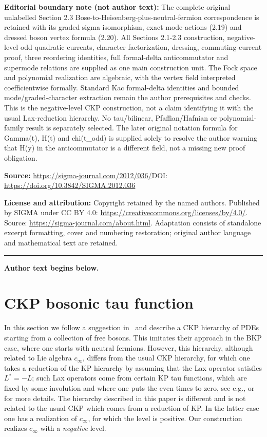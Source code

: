 \documentclass[11pt]{article}
\numberwithin{equation}{section}
\begin{document}
\noindent\textbf{Editorial boundary note (not author text):} The complete original unlabelled Section 2.3 Bose-to-Heisenberg-plus-neutral-fermion correspondence is retained with its graded sigma isomorphism, exact mode actions (2.19) and dressed boson vertex formula (2.20). All Sections 2.1-2.3 construction, negative-level odd quadratic currents, character factorization, dressing, commuting-current proof, three reordering identities, full formal-delta anticommutator and supermode relations are supplied as one main construction unit. The Fock space and polynomial realization are algebraic, with the vertex field interpreted coefficientwise formally. Standard Kac formal-delta identities and bounded mode/graded-character extraction remain the author prerequisites and checks. This is the negative-level CKP construction, not a claim identifying it with the usual Lax-reduction hierarchy. No tau/bilinear, Pfaffian/Hafnian or polynomial-family result is separately selected. The later original notation formula for Gamma(t), H(t) and chi(t\_odd) is supplied solely to resolve the author warning that H(y) in the anticommutator is a different field, not a missing new proof obligation.\par
\noindent\textbf{Source:} \url{https://sigma-journal.com/2012/036/}\quad DOI: \url{https://doi.org/10.3842/SIGMA.2012.036}\par
\noindent\textbf{License and attribution:} Copyright retained by the named authors. Published by SIGMA under CC BY 4.0: \url{https://creativecommons.org/licenses/by/4.0/}. Source: \url{https://sigma-journal.com/about.html}. Adaptation consists of standalone excerpt formatting, cover and numbering restoration; original author language and mathematical text are retained.\par
\medskip\hrule\medskip\noindent\textbf{Author text begins below.}\par
\setcounter{section}{1}
\setcounter{subsection}{0}
\setcounter{subsubsection}{0}
\setcounter{equation}{0}
\section{CKP bosonic tau function\label{CKPbosonic}}

In this section we follow a suggestion in~\cite{DJKMVI} and describe a CKP hierarchy of PDEs starting from  a collection of free bosons.
This imitates their approach in the BKP case, where one starts with neutral fermions.
However, this hierarchy, although related to Lie algebra $c_\infty$,
dif\/fers from the usual CKP hierarchy, for which one takes
a reduction of the KP hierarchy by assuming that the Lax operator
satisf\/ies $L^*=-L$; such Lax operators come from certain KP tau functions,
which are f\/ixed by some involution and where one puts the even times to zero,
see e.g., \cite{DJKMVI} or \cite{AL} for more details.
The hierarchy described in this paper is dif\/ferent and is not related to the
usual CKP which comes from a reduction of KP. In the latter case
one has a realization of $c_\infty$, for which the level is positive.
Our construction realizes  $c_\infty$ with a {\it negative\/} level.
\end{document}
